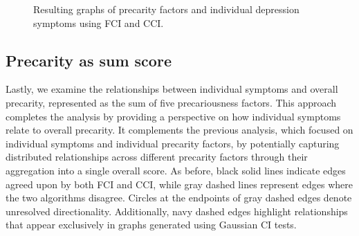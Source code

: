 \documentclass[
]{article}
\begin{document}
\begin{figure}


\caption{\label{fig-sym}Resulting graphs of precarity factors and
individual depression symptoms using FCI and CCI.}

\end{figure}%

\subsection{Precarity as sum score}\label{precarity-as-sum-score}

Lastly, we examine the relationships between individual symptoms and
overall precarity, represented as the sum of five precariousness
factors. This approach completes the analysis by providing a perspective
on how individual symptoms relate to overall precarity. It complements
the previous analysis, which focused on individual symptoms and
individual precarity factors, by potentially capturing distributed
relationships across different precarity factors through their
aggregation into a single overall score. As before, black solid lines
indicate edges agreed upon by both FCI and CCI, while gray dashed lines
represent edges where the two algorithms disagree. Circles at the
endpoints of gray dashed edges denote unresolved directionality.
Additionally, navy dashed edges highlight relationships that appear
exclusively in graphs generated using Gaussian CI tests.
\end{document}
